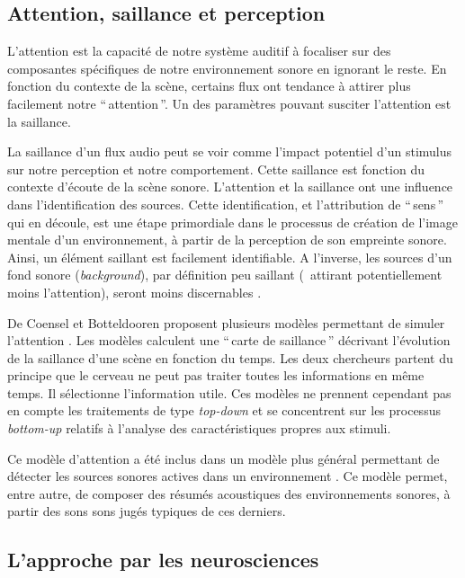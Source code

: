 \subsection{Attention, saillance et perception}

L'attention est la capacité de notre système auditif à focaliser sur des composantes spécifiques de notre environnement sonore en ignorant le reste. En fonction du contexte de la scène, certains flux ont tendance à attirer plus facilement notre ``\,attention\,''. Un des paramètres pouvant susciter l’attention est la saillance.

La saillance d’un flux audio peut se voir comme l’impact potentiel d’un stimulus sur notre perception et notre comportement. Cette saillance est fonction du contexte d'écoute de la scène sonore. L’attention et la saillance ont une influence dans l’identification des sources. Cette identification, et l'attribution de ``\,sens\,'' qui en découle, est une étape primordiale dans le processus de création de l’image mentale d’un environnement, à partir de la perception de son empreinte sonore. Ainsi, un élément saillant est facilement identifiable. A l'inverse, les sources d'un fond sonore (\emph{background}), par définition peu saillant (\ie~attirant potentiellement moins l’attention), seront moins discernables \citep{elhilali2009interaction}.

De Coensel et Botteldooren proposent plusieurs modèles permettant de simuler l’attention \citep{botteldooren2009role,de2010model,de2010application}. Les modèles calculent une ``\,carte de saillance\,'' décrivant l’évolution de la saillance d’une scène en fonction du temps. Les deux chercheurs partent du principe que le cerveau ne peut pas traiter toutes les informations en même temps. Il sélectionne l'information utile. Ces modèles ne prennent cependant pas en compte les traitements de type \emph{top-down} et se concentrent sur les processus \emph{bottom-up} relatifs à l’analyse des caractéristiques propres aux stimuli.

Ce modèle d'attention a été inclus dans un modèle plus général permettant de détecter les sources sonores actives dans un environnement \citep{oldoni2012computational,oldoni2013computational}. Ce modèle permet, entre autre, de composer des résumés acoustiques des environnements sonores, à partir des sons sons jugés typiques de ces derniers.

\subsection{L'approche par les neurosciences}

